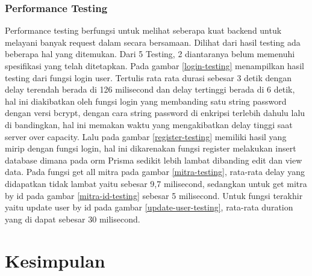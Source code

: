 \subsubsection{Performance Testing}
Performance testing berfungsi untuk melihat seberapa kuat backend untuk melayani banyak request dalam secara bersamaan. Dilihat dari hasil testing ada beberapa hal yang ditemukan. Dari 5 Testing, 2 diantaranya belum memenuhi spesifikasi yang telah ditetapkan. Pada gambar \ref{login-testing} menampilkan hasil testing dari fungsi login user. Tertulis rata rata durasi sebesar 3 detik dengan delay terendah berada di 126 milisecond dan delay tertinggi berada di 6 detik, hal ini diakibatkan oleh fungsi login yang membanding satu string password dengan versi bcrypt, dengan cara string password di enkripsi terlebih dahulu lalu di bandingkan, hal ini memakan waktu yang mengakibatkan delay tinggi saat server over capacity. Lalu pada gambar \ref{register-testing} memiliki hasil yang mirip dengan fungsi login, hal ini dikarenakan fungsi register melakukan insert database dimana pada orm Prisma sedikit lebih lambat dibanding edit dan view data. Pada fungsi get all mitra pada gambar \ref{mitra-testing}, rata-rata delay yang didapatkan tidak lambat yaitu sebesar 9,7 milisecond, sedangkan untuk get mitra by id pada gambar \ref{mitra-id-testing} sebesar 5 milisecond. Untuk fungsi terakhir yaitu update user by id pada gambar \ref{update-user-testing}, rata-rata duration yang di dapat sebesar 30 milisecond.


\section{Kesimpulan}

